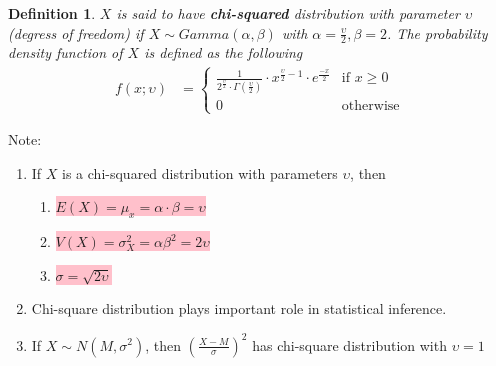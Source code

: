 \documentclass[11pt,oneside]{book}
\theoremstyle{newStyle}
\newtheorem{defn}[thm]{Definition}
\newcommand{\note}{\color{red}Note: \color{black}}
\begin{document}
\begin{defn}
$X$ is said to have \textbf{chi-squared} distribution with parameter $\upsilon$ (degress of freedom) if $X\sim Gamma(\alpha,\beta)$ with $\alpha=\frac{\upsilon}{2},\beta=2$. The probability density function of $X$ is defined as the following \begin{align*}
f(x;\upsilon)&=\begin{cases}
\frac{1}{2^{\frac{\upsilon}{2}}\cdot \Gamma\left(\frac{\upsilon}{2}\right)}\cdot x^{\frac{\upsilon}{2}-1}\cdot e^{\frac{-x}{2}}&\text{if }x\geq 0\\
0&\text{otherwise}
\end{cases}
\end{align*}
\end{defn}
\note \begin{enumerate}
\item If $X$ is a chi-squared distribution with parameters $\upsilon$, then\begin{enumerate}
\item \colorbox{pink}{$E(X)=\mu_x=\alpha \cdot \beta=\upsilon$}
\item \colorbox{pink}{$V(X)=\sigma_X^2=\alpha \beta^2=2\upsilon$}
\item \colorbox{pink}{$\sigma=\sqrt{2\upsilon}$}
\end{enumerate}
\item Chi-square distribution plays important role in statistical inference.
\item If $X\sim N(M,\sigma^2)$, then $\left(\frac{X-M}{\sigma} \right)^2$ has chi-square distribution with $\upsilon=1$
\end{enumerate}
\end{document}
